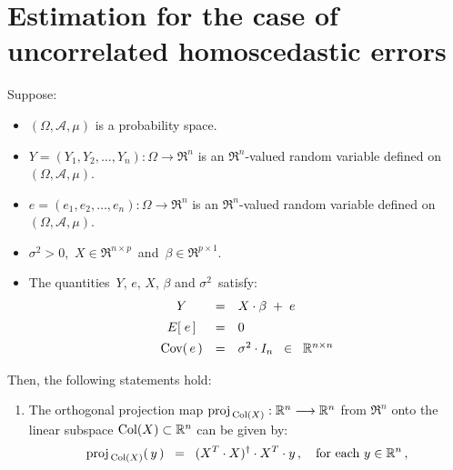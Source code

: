 

\section{Estimation for the case of uncorrelated homoscedastic errors}
\setcounter{theorem}{0}
\setcounter{equation}{0}

\renewcommand{\theenumi}{\roman{enumi}}
\renewcommand{\labelenumi}{\textnormal{(\theenumi)}$\;\;$}


\begin{theorem}
\mbox{}
\vskip 0.2cm
\noindent
Suppose:
\begin{itemize}
\item
	$(\Omega,\mathcal{A},\mu)$ is a probability space.
\item
	$Y = (Y_{1}, Y_{2}, \ldots, Y_{n}) : \Omega \longrightarrow \Re^{n}$ is an $\Re^{n}$-valued random variable
	defined on $(\Omega,\mathcal{A},\mu)$.
\item
	$e = (e_{1}, e_{2}, \ldots, e_{n}) : \Omega \longrightarrow \Re^{n}$ is an $\Re^{n}$-valued random variable
	defined on $(\Omega,\mathcal{A},\mu)$.
\item
	$\sigma^{2} > 0$,\, $X \in \Re^{n \times p}$\, and \,$\beta \in \Re^{p \times 1}$.
\item
	The quantities \,$Y$, $e$, $X$, $\beta$ and $\sigma^{2}$\, satisfy:
	\begin{equation*}
	\begin{array}{ccl}
	Y & = & X \cdot \beta \; + \; e
	\\
	E\!\left[\;e\,\right] &  \overset{{\color{white}\vert}}{=} & 0
	\\
	\Cov\!\left(\,e\,\right) & \overset{{\color{white}\vert}}{=} & \sigma^{2} \cdot I_{n} \;\; \in \;\; \Re^{n \times n}
	\end{array}
	\end{equation*}
\end{itemize}
Then, the following statements hold:
\begin{enumerate}
\item
	The orthogonal projection map $\textnormal{proj}_{\,\textnormal{Col}(X)} : \mathbb{R}^{n} \longrightarrow \mathbb{R}^{n}$
	from $\Re^{n}$ onto the linear subspace $\textnormal{Col}(X) \subset \mathbb{R}^{n}$ can be given by:
	\begin{equation*}
	\proj_{\,\Col(X)}(\,y\,) \;\; = \;\; (X^{T}\cdot X)^{\dagger} \cdot X^{T} \cdot y\,,
	\quad
	\textnormal{for each $y \in \Re^{n}$}\,,

\end{equation*}
\end{enumerate}
\end{theorem}
